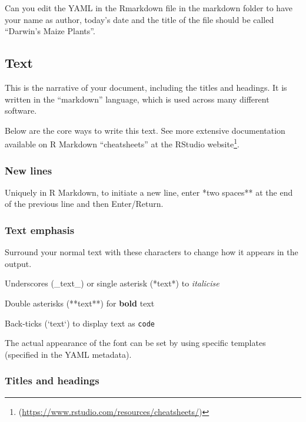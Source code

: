 \documentclass[
]{book}
\makeatletter
\newenvironment{kframe}{%
\medskip{}
\setlength{\fboxsep}{.8em}
 \def\at@end@of@kframe{}%
 \ifinner\ifhmode%
  \def\at@end@of@kframe{\end{minipage}}%
  \begin{minipage}{\columnwidth}%
 \fi\fi%
 \def\FrameCommand##1{\hskip\@totalleftmargin \hskip-\fboxsep
 \colorbox{shadecolor}{##1}\hskip-\fboxsep
     \hskip-\linewidth \hskip-\@totalleftmargin \hskip\columnwidth}%
 \MakeFramed {\advance\hsize-\width
   \@totalleftmargin\z@ \linewidth\hsize
   \@setminipage}}%
 {\par\unskip\endMakeFramed%
 \at@end@of@kframe}
\newenvironment{block}[1]
  {
  \begin{itemize}
  \renewcommand{\labelitemi}{
    \raisebox{-.7\height}[0pt][0pt]{
      {\setkeys{Gin}{width=3em,keepaspectratio}\texttt{[image: images/\#1]}}
    }
  }
  \setlength{\fboxsep}{1em}
  \begin{kframe}
  \item
  }
  {
  \end{kframe}
  \end{itemize}
  }
\newenvironment{rmdquestion}
  {\begin{block}{question}}
  {\end{block}}
\makeatother
\begin{document}
\begin{rmdquestion}
Can you edit the YAML in the Rmarkdown file in the markdown folder to
have your name as author, today's date and the title of the file should
be called ``Darwin's Maize Plants''.
\end{rmdquestion}

\hypertarget{text}{%
\subsection{Text}\label{text}}

This is the narrative of your document, including the titles and headings. It is written in the ``markdown'' language, which is used across many different software.

Below are the core ways to write this text. See more extensive documentation available on R Markdown ``cheatsheets'' at the RStudio website\footnote{(\url{https://www.rstudio.com/resources/cheatsheets/})}.

\hypertarget{new-lines}{%
\subsubsection{New lines}\label{new-lines}}

Uniquely in R Markdown, to initiate a new line, enter *two spaces** at the end of the previous line and then Enter/Return.

\hypertarget{text-emphasis}{%
\subsubsection{Text emphasis}\label{text-emphasis}}

Surround your normal text with these characters to change how it appears in the output.

Underscores (\_text\_) or single asterisk (*text*) to \emph{italicise}

Double asterisks (**text**) for \textbf{bold} text

Back-ticks (`text`) to display text as \texttt{code}

The actual appearance of the font can be set by using specific templates (specified in the YAML metadata).

\hypertarget{titles-and-headings}{%
\subsubsection{Titles and headings}\label{titles-and-headings}}
\end{document}
